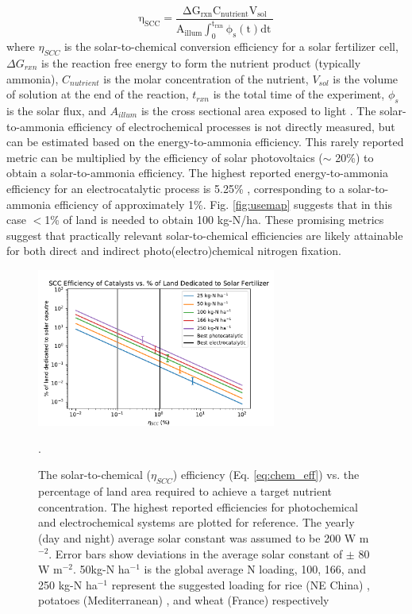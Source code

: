 \begin{equation}
\label{eq:chem_eff}
\mathrm{
\eta_{SCC} = \frac{\Delta G_{rxn}C_{nutrient}V_{sol}}{A_{illum} \int_{0}^{t_{rxn}}\phi_s(t) dt \: }
}
\end{equation}
where $\eta_{SCC}$ is the solar-to-chemical conversion efficiency for a solar fertilizer cell, $\Delta G_{rxn}$ is the reaction free energy to form the nutrient product (typically ammonia), $C_{nutrient}$ is the molar concentration of the nutrient, $V_{sol}$ is the volume of solution at the end of the reaction, $t_{rxn}$ is the total time of the experiment, $\phi_s$ is the solar flux, and $A_{illum}$ is the cross sectional area exposed to light \cite{Chen_2010}. The solar-to-ammonia efficiency of electrochemical processes is not directly measured, but can be estimated based on the energy-to-ammonia efficiency. This rarely reported metric can be multiplied by the efficiency of solar photovoltaics ($\sim$ 20\%) to obtain a solar-to-ammonia efficiency. The highest reported energy-to-ammonia efficiency for an electrocatalytic process is 5.25\% \cite{Song_2018}, corresponding to a solar-to-ammonia efficiency of approximately 1\%. Fig. \ref{fig:usemap} suggests that in this case $<$1\% of land is needed to obtain 100 kg-N/ha. These promising metrics suggest that practically relevant solar-to-chemical efficiencies are likely attainable for both direct and indirect photo(electro)chemical nitrogen fixation.


\begin{figure}
    \centering
    \includegraphics[width=0.7\textwidth]{Figures/footprint.pdf}
    \caption{The solar-to-chemical ($\eta_{SCC}$) efficiency (Eq. \ref{eq:chem_eff}) vs. the percentage of land area required to achieve a target nutrient concentration. The highest reported efficiencies for photochemical \cite{Shiraishi_2018} and electrochemical \cite{Song_2018} systems are plotted for reference. The yearly (day and night) average solar constant was assumed to be 200 W m$^{-2}$. Error bars show deviations in the average solar constant of $\pm$ 80 W m$^{-2}$. 50kg-N ha$^{-1}$ is the global average N loading, 100, 166, and 250 kg-N ha$^{-1}$ represent the suggested loading for rice (NE China) \cite{HUANG_2018}, potatoes (Mediterranean) \cite{Waller_2016}, and wheat (France) respectively \cite{Stockle_1997}}.
    \label{fig:eff_footprint}
\end{figure}

